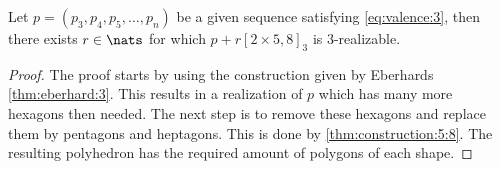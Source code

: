 \begin{corollary}
  Let $p = (p_3, p_4, p_5, \dots, p_n)$ be a given sequence satisfying \autoref{eq:valence:3}, then there exists $r \in \nats$ for which $p + r [2 \times 5, 8]_3$ is $3$-realizable.
  \begin{proof}
    The proof starts by using the construction given by Eberhards \autoref{thm:eberhard:3}. This results in a realization of $p$ which has many more hexagons then needed. The next step is to remove these hexagons and replace them by pentagons and heptagons. This is done by \autoref{thm:construction:5:8}. The resulting polyhedron has the required amount of polygons of each shape.
  \end{proof}
\end{corollary}

